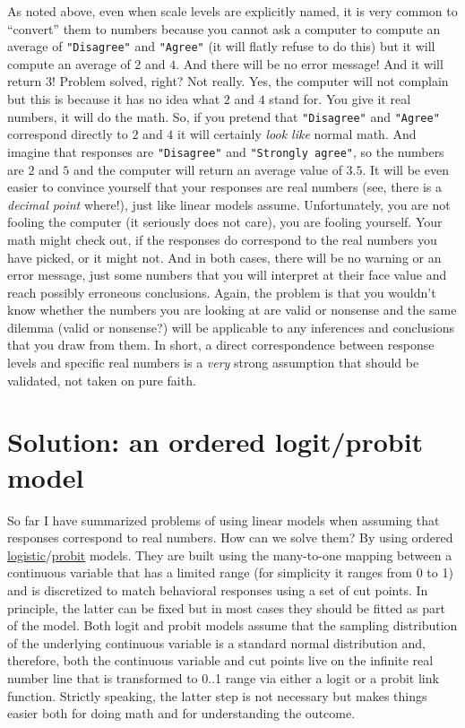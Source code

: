 \documentclass[
]{book}
\begin{document}
As noted above, even when scale levels are explicitly named, it is very common to ``convert'' them to numbers because you cannot ask a computer to compute an average of \texttt{"Disagree"} and \texttt{"Agree"} (it will flatly refuse to do this) but it will compute an average of \(2\) and \(4\). And there will be no error message! And it will return \(3\)! Problem solved, right? Not really. Yes, the computer will not complain but this is because it has no idea what \(2\) and \(4\) stand for. You give it real numbers, it will do the math. So, if you pretend that \texttt{"Disagree"} and \texttt{"Agree"} correspond directly to \(2\) and \(4\) it will certainly \emph{look like} normal math. And imagine that responses are \texttt{"Disagree"} and \texttt{"Strongly\ agree"}, so the numbers are \(2\) and \(5\) and the computer will return an average value of \(3.5\). It will be even easier to convince yourself that your responses are real numbers (see, there is a \emph{decimal point} where!), just like linear models assume. Unfortunately, you are not fooling the computer (it seriously does not care), you are fooling yourself. Your math might check out, if the responses do correspond to the real numbers you have picked, or it might not. And in both cases, there will be no warning or an error message, just some numbers that you will interpret at their face value and reach possibly erroneous conclusions. Again, the problem is that you wouldn't know whether the numbers you are looking at are valid or nonsense and the same dilemma (valid or nonsense?) will be applicable to any inferences and conclusions that you draw from them. In short, a direct correspondence between response levels and specific real numbers is a \emph{very} strong assumption that should be validated, not taken on pure faith.

\hypertarget{solution-an-ordered-logitprobit-model}{%
\section{Solution: an ordered logit/probit model}\label{solution-an-ordered-logitprobit-model}}

So far I have summarized problems of using linear models when assuming that responses correspond to real numbers. How can we solve them? By using ordered \href{https://en.wikipedia.org/wiki/Ordered_logit}{logistic}/\href{https://en.wikipedia.org/wiki/Ordered_probit\#:~:text=In\%20statistics\%2C\%20ordered\%20probit\%20is,fair\%2C\%20good\%2C\%20excellent}{probit} models. They are built using the many-to-one mapping between a continuous variable that has a limited range (for simplicity it ranges from 0 to 1) and is discretized to match behavioral responses using a set of cut points. In principle, the latter can be fixed but in most cases they should be fitted as part of the model. Both logit and probit models assume that the sampling distribution of the underlying continuous variable is a standard normal distribution and, therefore, both the continuous variable and cut points live on the infinite real number line that is transformed to 0..1 range via either a logit or a probit link function. Strictly speaking, the latter step is not necessary but makes things easier both for doing math and for understanding the outcome.
\end{document}
